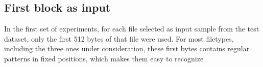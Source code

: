 % 










\subsection{First block as input}
In the first set of experiments, for each file selected as input sample from the test dataset, only the first 512 bytes of that file were used. For most filetypes, including the three ones under consideration, these first bytes contains regular patterns in fixed positions, which makes them easy to recognize

